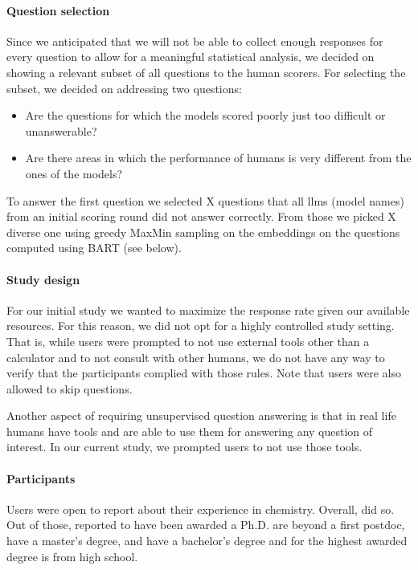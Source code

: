 \documentclass[11pt, oneside]{article}
\begin{document}
\begin{refsection}
\paragraph{Question selection} \label{sec:subset-selection}
Since we anticipated that we will not be able to collect enough responses for every question to allow for a meaningful statistical analysis, we decided on showing a relevant subset of all questions to the human scorers.
For selecting the subset, we decided on addressing two questions:
\begin{itemize}
    \item Are the questions for which the models scored poorly just too difficult or unanswerable?
    \item Are there areas in which the performance of humans is very different from the ones of the models?
\end{itemize}
To answer the first question we selected X questions that all \glspl{llm} (model names) from an initial scoring round did not answer correctly.
From those we picked X diverse one using greedy MaxMin sampling on the embeddings on the questions computed using BART (see below).


\paragraph{Study design}
For our initial study we wanted to maximize the response rate given our available resources. 
For this reason, we did not opt for a highly controlled study setting. 
That is, while users were prompted to not use external tools other than a calculator and to not consult with other humans, we do not have any way to verify that the participants complied with those rules. 
Note that users were also allowed to skip questions.

Another aspect of requiring unsupervised question answering is that in real life humans have tools and are able to use them for answering any question of interest. 
In our current study, we prompted users to not use those tools.

\paragraph{Participants}
Users were open to report about their experience in chemistry. 
Overall,  did so. 
Out of those,  reported to have been awarded a Ph.D.
 are beyond a first postdoc,  have a master's degree, and  have a bachelor's degree and for  the highest awarded degree is from high school.



\end{refsection}
\end{document}

